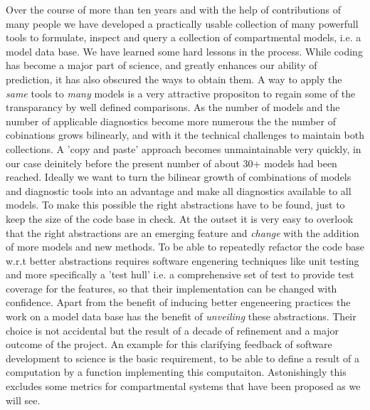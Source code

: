 Over the course of more than ten years and with the help of contributions of many people we have 
developed a practically usable collection of many powerfull tools to formulate, inspect and query a collection of compartmental models, i.e. a model data base.
We have learned some hard lessons in the process. 
While coding has become a major part of science, and greatly enhances our ability of prediction, it has also obscured the ways to obtain them. 
A way to apply the \emph{same} tools to \emph{many} models is a very attractive propositon to regain some of the transparancy by well defined comparisons. 
As the number of models and the number of applicable diagnostics become more numerous the 
the number of cobinations grows bilinearly, and with it the 
technical challenges to maintain both collections.
A 'copy and paste' approach becomes unmaintainable very quickly, 
in our case deinitely before the present number of about 30+ models had been reached. 
Ideally we want to turn the bilinear growth of combinations of models and diagnostic tools 
into an advantage and make all diagnostics available to all models. 
To make this possible the right abstractions have to be found, 
just to keep the size of the code base in check. 
At the outset it is very easy to overlook that the right abstractions 
are an emerging feature and \emph{change} with the addition of more models and new methods.
To be able to repeatedly refactor the code base w.r.t better abstractions 
requires software engenering techniques like unit testing and more specifically a 
'test hull' i.e. a comprehensive set of test to provide test coverage for the features, so that their implementation can be changed with confidence.
Apart from the benefit of inducing better engeneering practices the work on a
model data base has the benefit of \emph{unveiling} these abstractions.  
Their choice is not accidental but the result of a decade of refinement and a major 
outcome of the project. 
An example for this clarifying feedback of software development to science is  
the basic requirement, to be able to  define  a result of a computation by a function implementing this computaiton.
Astonishingly this excludes some metrics for compartmental systems that have been proposed as we will see.

